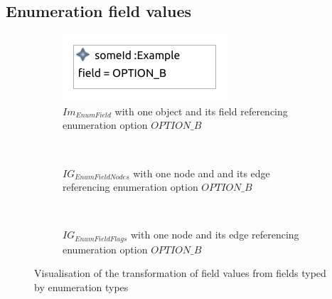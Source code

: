 \subsection{Enumeration field values}
\label{subsec:library_of_transformations:instance_level_transformations:enum_field_values}

\begin{figure}
    \centering
    \begin{subfigure}{0.95\textwidth}
        \centering
        \includegraphics{images/05_library_of_transformations/03_instance_level_transformations/07_enum_field_values/enum_field_value.pdf}
        \caption{$Im_{EnumField}$ with one object and its field referencing enumeration option $OPTION\!\_B$}
        \label{fig:library_of_transformations:instance_level_transformations:enum_field_values:visualisation:ecore}
    \end{subfigure}
    \\
    \begin{subfigure}{0.95\textwidth}
        \centering
        
        \caption{$IG_{EnumFieldNodes}$ with one node and and its edge referencing enumeration option $OPTION\!\_B$}
        \label{fig:library_of_transformations:instance_level_transformations:enum_field_values:visualisation:groove_nodes}
    \end{subfigure}
    \\
    \begin{subfigure}{0.95\textwidth}
        \centering
        
        \caption{$IG_{EnumFieldFlags}$ with one node and its edge referencing enumeration option $OPTION\!\_B$}
        \label{fig:library_of_transformations:instance_level_transformations:enum_field_values:visualisation:groove_flags}
    \end{subfigure}
    \caption{Visualisation of the transformation of field values from fields typed by enumeration types}
    \label{fig:library_of_transformations:instance_level_transformations:enum_field_values:visualisation}
\end{figure}

